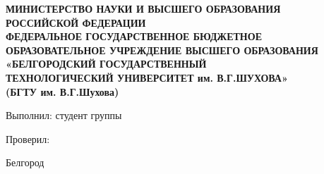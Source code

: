 \begin{titlepage}
\thispagestyle{empty}
\setlength{\parindent}{0ex} 

\begin{center}
  \textbf{МИНИСТЕРСТВО НАУКИ И ВЫСШЕГО ОБРАЗОВАНИЯ\\
РОССИЙСКОЙ ФЕДЕРАЦИИ\\
ФЕДЕРАЛЬНОЕ ГОСУДАРСТВЕННОЕ БЮДЖЕТНОЕ ОБРАЗОВАТЕЛЬНОЕ УЧРЕЖДЕНИЕ
ВЫСШЕГО ОБРАЗОВАНИЯ
«БЕЛГОРОДСКИЙ ГОСУДАРСТВЕННЫЙ\\
ТЕХНОЛОГИЧЕСКИЙ УНИВЕРСИТЕТ им. В.Г.ШУХОВА»\\
(БГТУ им. В.Г.Шухова)
}
\end{center}

\vspace{50mm}

\begin{center}
  \LabLineTitle
  \SubjectLineTitle
  \ThemeLineTitle
\end{center}

\vspace{40mm}

\begin{minipage}{.60\linewidth}
    Выполнил: студент группы \Group

    \smallskip

    Проверил:
\end{minipage}
\hfill
\begin{minipage}{.4\linewidth}
  \begin{flushright}
    \AuthorFIO

    \smallskip

    \LecturerFIO
  \end{flushright}
\end{minipage}

\vfill
\begin{center}
  Белгород \Year
\end{center}

\setlength{\parindent}{1.25cm} 
\end{titlepage}
